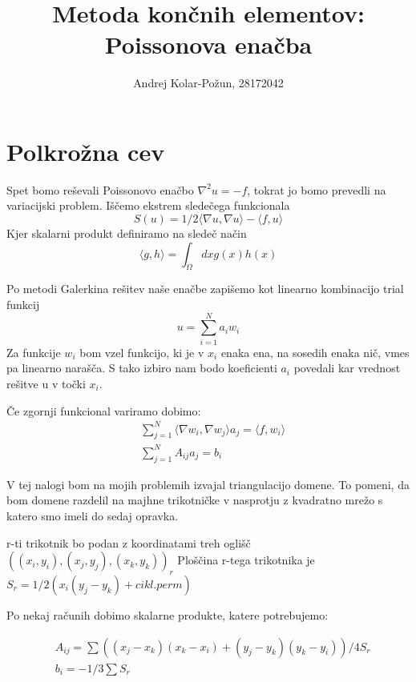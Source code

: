 \documentclass{article}
\title{Metoda končnih elementov: Poissonova enačba}
\author{Andrej Kolar-Požun, 28172042}
\begin{document}
\maketitle
{}
\section{Polkrožna cev}

Spet bomo reševali Poissonovo enačbo $\nabla^2 u = -f$, tokrat jo bomo prevedli na variacijski problem. Iščemo ekstrem sledečega funkcionala
\begin{equation*}
S(u) = 1/2 \langle \nabla u, \nabla u \rangle -  \langle f,u \rangle
\end{equation*}
Kjer skalarni produkt definiramo na sledeč način
\begin{equation*}
\langle g,h \rangle = \int_\Omega dx g(x) h(x) 
\end{equation*}

Po metodi Galerkina rešitev naše enačbe zapišemo kot linearno kombinacijo trial funkcij
\begin{equation*}
u = \sum_{i=1}^N a_i w_i
\end{equation*}
Za funkcije $w_i$ bom vzel funkcijo, ki je v $x_i$ enaka ena, na sosedih enaka nič, vmes pa linearno narašča. S tako izbiro nam bodo koeficienti $a_i$ povedali kar vrednost rešitve u v točki $x_i$.

Če zgornji funkcional variramo dobimo:
\begin{align*}
&\sum_{j=1}^N \langle \nabla w_i , \nabla w_j \rangle a_j = \langle f , w_i \rangle \\
&\sum_{j=1}^N A_{ij} a_j = b_i
\end{align*}

V tej nalogi bom na mojih problemih izvajal triangulacijo domene. To pomeni, da bom domene razdelil na majhne trikotničke v nasprotju z kvadratno mrežo s katero smo imeli do sedaj opravka.

r-ti trikotnik bo podan z koordinatami treh oglišč $((x_i,y_i),(x_j,y_j),(x_k,y_k))_r$
Ploščina r-tega trikotnika je $S_r = 1/2( x_i(y_j - y_k) + cikl. perm)$


Po nekaj računih dobimo skalarne produkte, katere potrebujemo:

\begin{align*}
&A_{ij} = \sum ((x_j - x_k)(x_k - x_i) + (y_j - y_k)(y_k-y_i))/4S_r \\
&b_i = -1/3 \sum S_r
\end{align*}
\end{document}
